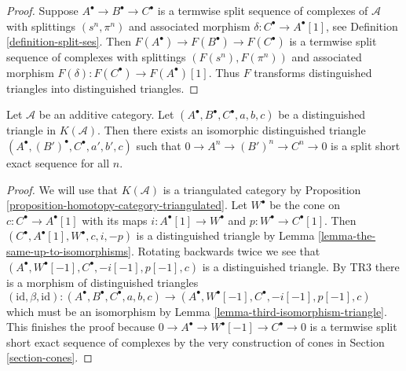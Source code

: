 \begin{proof}
Suppose $A^\bullet \to B^\bullet \to C^\bullet$
is a termwise split sequence of complexes of $\mathcal{A}$ with splittings
$(s^n, \pi^n)$ and associated morphism $\delta : C^\bullet \to A^\bullet[1]$,
see Definition \ref{definition-split-ses}. Then
$F(A^\bullet) \to F(B^\bullet) \to F(C^\bullet)$
is a termwise split sequence of complexes with splittings
$(F(s^n), F(\pi^n))$ and associated morphism
$F(\delta) : F(C^\bullet) \to F(A^\bullet)[1]$.
Thus $F$ transforms distinguished triangles into distinguished triangles.
\end{proof}

\begin{lemma}
\label{lemma-improve-distinguished-triangle-homotopy}
Let $\mathcal{A}$ be an additive category. Let
$(A^\bullet, B^\bullet, C^\bullet, a, b, c)$ be a distinguished triangle in
$K(\mathcal{A})$. Then there exists an isomorphic distinguished triangle
$(A^\bullet, (B')^\bullet, C^\bullet, a', b', c)$ such that
$0 \to A^n \to (B')^n \to C^n \to 0$ is a split short exact sequence
for all $n$.
\end{lemma}

\begin{proof}
We will use that $K(\mathcal{A})$ is a triangulated category by
Proposition \ref{proposition-homotopy-category-triangulated}.
Let $W^\bullet$ be the cone on $c : C^\bullet \to A^\bullet[1]$ with its maps
$i : A^\bullet[1] \to W^\bullet$ and $p : W^\bullet \to C^\bullet[1]$. Then
$(C^\bullet, A^\bullet[1], W^\bullet, c, i, -p)$ is a distinguished triangle
by Lemma \ref{lemma-the-same-up-to-isomorphisms}. Rotating backwards twice
we see that $(A^\bullet, W^\bullet[-1], C^\bullet, -i[-1], p[-1], c)$
is a distinguished triangle. By TR3 there is a morphism of distinguished
triangles
$(\text{id}, \beta, \text{id}) : (A^\bullet, B^\bullet, C^\bullet, a, b, c) \to
(A^\bullet, W^\bullet[-1], C^\bullet, -i[-1], p[-1], c)$
which must be an isomorphism by Lemma \ref{lemma-third-isomorphism-triangle}.
This finishes the proof because
$0 \to A^\bullet \to W^\bullet[-1] \to C^\bullet \to 0$
is a termwise split short exact sequence of complexes
by the very construction of cones in Section \ref{section-cones}.
\end{proof}

